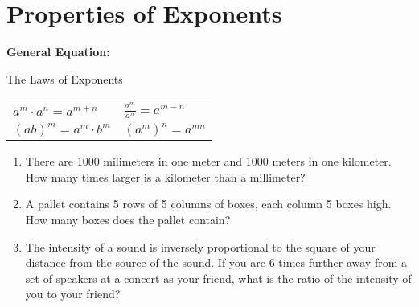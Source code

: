 \section{Properties of Exponents}

\bigskip
\textbf{General Equation:} 

\centerline{The Laws of Exponents}

\begin{spacing}{2}
\begin{tabularx}{\textwidth}{*2{@{}>{\centering\arraybackslash}X}}
$a^m\cdot a^n = a^{m+n}$ & $\frac{a^m}{a^n}=a^{m-n}$\\
$(ab)^m=a^m\cdot b^m$ & $(a^m)^n=a^{mn}$
\end{tabularx}
\end{spacing}

\vfill
\begin{enumerate}[labelindent=*,style=multiline,leftmargin=*,label=\textbf{Example \arabic*:}]
\item There are 1000 milimeters in one meter and 1000 meters in one kilometer. How many times larger is a kilometer than a millimeter?

\vfill\item A pallet contains 5 rows of 5 columns of boxes, each column 5 boxes high. How many boxes does the pallet contain?

\vfill\item The intensity of a sound is inversely proportional to the square of your distance from the source of the sound. If  you are 6 times further away from a set of speakers at a concert as your friend, what is the ratio of the intensity of you to your friend?
\end{enumerate}

